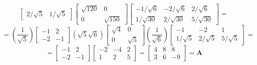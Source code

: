 \begin{enumerate}[font=\bfseries]
\begin{enumerate}
\[\begin{bmatrix}
                    2/\sqrt{5} & 1/\sqrt{5}
                \end{bmatrix}
                \begin{bmatrix}
                    \sqrt{120} & 0 \\
                    0 & \sqrt{150}
                \end{bmatrix}
                \begin{bmatrix}
                    -1/\sqrt{6} & -2/\sqrt{6} & 2/\sqrt{6} \\
                    1/\sqrt{30} & 2/\sqrt{30} & 5/\sqrt{30}
                \end{bmatrix}
                =
            \]
            \[
                =
                \left(\frac{1}{\sqrt{5}}\right)
                \begin{bmatrix}
                    -1 & 2 \\
                    -2 & -1
                \end{bmatrix}
                \left(\sqrt{5}\sqrt{6}\right)
                \begin{bmatrix}
                    \sqrt{4} & 0 \\
                    0 & \sqrt{5}
                \end{bmatrix}
                \left(\frac{1}{\sqrt{6}}\right)
                \begin{bmatrix}
                    -1 & -2 & 1 \\
                    1/\sqrt{5} & 2/\sqrt{5} & 5/\sqrt{5}
                \end{bmatrix}
                =
            \]
            \[
                =
                \begin{bmatrix}
                    -1 & 2 \\
                    -2 & -1
                \end{bmatrix}
                \begin{bmatrix}
                    -2 & -4 & 2 \\
                    1 & 2 & 5
                \end{bmatrix}
                =
                \begin{bmatrix}
                    4 & 8 & 8 \\
                    3 & 6 & -9
                \end{bmatrix}
                =
                \mathbf{A}
            \]
        \end{enumerate}

\end{enumerate}
